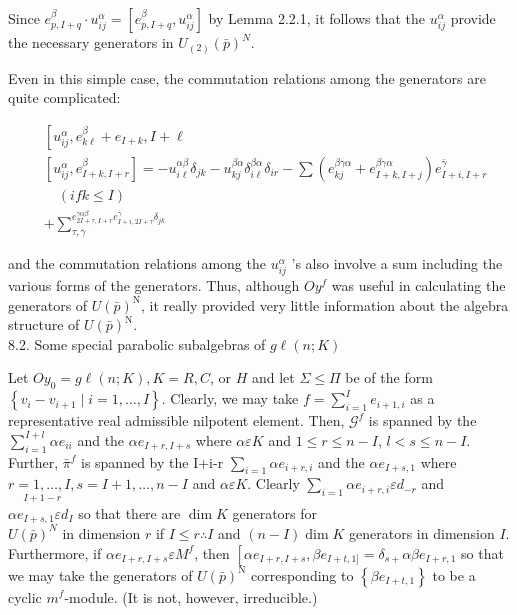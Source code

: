 \documentclass[10pt]{article}
\begin{document}
Since $e_{p, I+q}^{\beta} \cdot u_{i j}^{\alpha}=\left[e_{p, I+q}^{\beta}, u_{i j}^{\alpha}\right]$ by Lemma 2.2.1, it follows that the $u_{i j}^{\alpha}$ provide the necessary generators in $U_{(2)}(\bar{p})^{N}$.

Even in this simple case, the commutation relations among the generators are quite complicated:

$$
\begin{aligned}
& {\left[u_{i j}^{\alpha}, e_{k \ell}^{\beta}+e_{I+k}, I+\ell\right.} \\
& {\left[u_{i j}^{\alpha}, e_{I+k, I+r}^{\beta}\right]=-u_{i \ell}^{\alpha \beta} \delta_{j k}-u_{k j}^{\beta \alpha} \delta_{i \ell}^{\beta \alpha} \delta_{i r}-\sum\left(e_{k j}^{\beta \gamma \alpha}+e_{I+k, I+j}^{\beta \gamma \alpha}\right) e_{I+i, I+r}^{\bar{\gamma}}} \\
& \quad(i f k \leq I) \\
& +\sum_{\tau, \gamma}^{e_{2 I+\tau, I+r}^{\gamma \alpha \beta} e_{I+i, 2 I+\tau}^{\bar{\gamma}} \delta_{j k}}
\end{aligned}
$$

and the commutation relations among the $u_{i j}^{\alpha}$ 's also involve a sum including the various forms of the generators. Thus, although $O y^{f}$ was useful in calculating the generators of $U(\bar{p})^{\mathrm{N}}$, it really provided very little information about the algebra structure of $U(\bar{p})^{\mathrm{N}}$.\\
8.2. Some special parabolic subalgebras of $g \ell(n ; K)$

Let $O y_{0}=g \ell(n ; K), K=R, C$, or $H$ and let $\Sigma \leq \Pi$ be of the form $\left\{v_{i}-v_{i+1} \mid i=1, \ldots, I\right\}$. Clearly, we may take $f=\sum_{i=1}^{I} e_{i+1, i}$ as a representative real admissible nilpotent element. Then, $\mathcal{G}^{f}$ is spanned by the $\sum_{i=1}^{I+l} \alpha e_{i i}$ and the $\alpha e_{I+r, I+s}$ where $\alpha \varepsilon K$ and $1 \leq r \leq n-I$, $l<s \leq n-I$. Further, $\bar{\pi}^{f}$ is spanned by the I+i-r $\sum_{i=1} \alpha e_{i+r, i}$ and the $\alpha e_{I+s, 1}$ where $\underset{I+1-r}{r=1, \ldots, I,} s=I+1, \ldots, n-I$ and $\alpha \varepsilon K$. Clearly $\sum_{i=1} \alpha e_{i+r, i} \varepsilon d_{-r}$ and $\alpha e_{I+s, 1} \varepsilon d_{I}$ so that there are $\operatorname{dim} K$ generators for\\
$U(\bar{p})^{N}$ in dimension $r$ if $I \leq r \therefore I$ and $(n-I) \operatorname{dim} K$ generators in dimension $I$. Furthermore, if $\alpha e_{I+r, I+s} \varepsilon M^{f}$, then $\left[\alpha e_{I+r, I+s}, \beta e_{I+t, 1]}=\delta_{s+} \alpha \beta e_{I+r, 1}\right.$ so that we may take the generators of $U(\bar{p})^{\mathrm{N}}$ corresponding to $\left\{\beta e_{I+t, 1}\right\}$ to be a cyclic $m^{f}$-module. (It is not, however, irreducible.)
\end{document}
